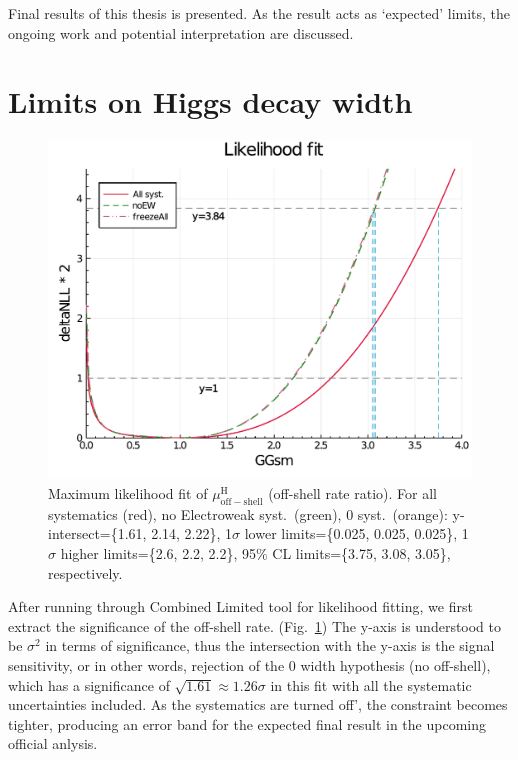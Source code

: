 Final results of this thesis is presented. As the result acts as
`expected' limits, the ongoing work and potential interpretation are discussed.
\pagebreak
\section{Limits on Higgs decay width}
\begin{figure}[htb]
    \centering
    \includegraphics[width=.6\linewidth]{fig/Final_fit_mu_offshell.pdf}
    \caption{Maximum likelihood fit of $\mu^\mathrm{H}_\mathrm{off-shell}$ (off-shell rate ratio).
    For all systematics (red), no Electroweak syst.~(green),
    0 syst.~(orange): y-intersect=\{1.61, 2.14, 2.22\}, 1$\sigma$ lower limits=\{0.025, 0.025, 0.025\},
1$\sigma$ higher limits=\{2.6, 2.2, 2.2\}, 95\% CL limits=\{3.75, 3.08, 3.05\}, respectively.}
    \label{fig:final_fit_mu}
\end{figure}
After running through Combined Limited tool for likelihood fitting, we first extract the significance
of the off-shell rate. (Fig.~\ref{fig:final_fit_mu})
The y-axis is understood to be $\sigma^2$ in terms of significance, thus
the intersection with the y-axis is the signal sensitivity, or in other words,
rejection of the 0 width hypothesis (no off-shell), which has a significance of 
$\sqrt{1.61} \approx 1.26\sigma$ in this fit with all the systematic uncertainties included.
As the systematics are turned off', the constraint becomes tighter, producing an error band for the expected
final result in the upcoming official anlysis.

